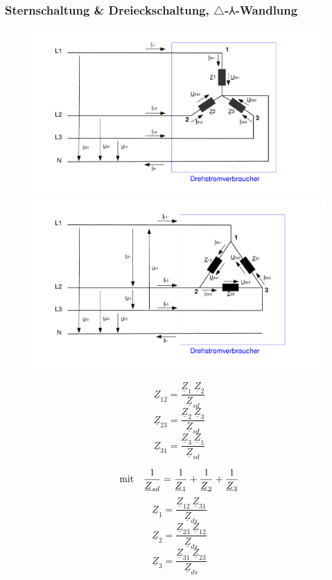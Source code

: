 \documentclass[11pt]{article}
\begin{document}
\begin{spacing}{0.1}
\subsubsection*{Sternschaltung \& Dreieckschaltung, $\triangle$-$\Yup$-Wandlung}
\begin{figure}[H]
	\centering
	\includegraphics[scale=0.26]{img/drehstrom_stern.pdf}
	\includegraphics[scale=0.26]{img/drehstrom_dreieck.pdf}
\end{figure}

\begin{multicols}{2}
\footnotesize
\[
	\underline{Z}_{12} = \frac{\underline{Z}_{1} ~ \underline{Z}_{2}}{\underline{Z}_{sd}}
\]
\[
	\underline{Z}_{23} = \frac{\underline{Z}_{2} ~ \underline{Z}_{3}}{\underline{Z}_{sd}}
\]
\[
	\underline{Z}_{31} = \frac{\underline{Z}_{3} ~ \underline{Z}_{1}}{\underline{Z}_{sd}}
\]

\[
	\textnormal{mit} \quad  \frac{1}{\underline{Z}_{sd}}=\frac{1}{\underline{Z}_1}+\frac{1}{\underline{Z}_2}+\frac{1}{\underline{Z}_3}
\]
\vfill
\columnbreak
\[
	\underline{Z}_1 = \frac{\underline{Z}_{12} ~ \underline{Z}_{31}}{\underline{Z}_{ds}}
\]
\[
	\underline{Z}_2 = \frac{\underline{Z}_{23} ~ \underline{Z}_{12}}{\underline{Z}_{ds}}
\]
\[
	\underline{Z}_3 = \frac{\underline{Z}_{31} ~ \underline{Z}_{23}}{\underline{Z}_{ds}}
\]


\end{multicols}
\end{spacing}
\end{document}
